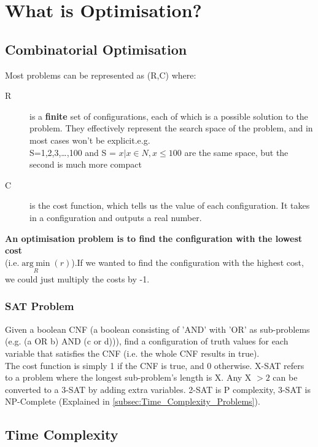 \section{What is Optimisation?}

\subsection{Combinatorial Optimisation}
Most problems can be represented as (R,C) where:
\begin{description}
    \item[R] is a \textbf{finite} set of configurations, each of which is a possible solution to the problem. They effectively represent the search space of the problem, and in most cases won't be explicit.e.g.\\
    S={1,2,3,\dots ,100} and S = ${x|x\in N, x\leq 100}$ are the same space, but the second is much more compact
    \item[C] is the cost function, which tells us the value of each configuration. It takes in a configuration and outputs a real number. 
\end{description}
\textbf{An optimisation problem is to find the configuration with the lowest cost}\\(i.e.$\underset{R}{\operatorname{arg\; min}}(r)$).If we wanted to find the configuration with the highest cost, we could just multiply the costs by -1.

\subsubsection{SAT Problem}
Given a boolean CNF (a boolean consisting of 'AND' with 'OR' as sub-problems\\(e.g. (a OR b) AND (c or d))), find a configuration of truth values for each variable that satisfies the CNF (i.e. the whole CNF results in true). \\
The cost function is simply 1 if the CNF is true, and 0 otherwise. X-SAT refers to a problem where the longest sub-problem's length is X. Any X $>2$ can be converted to a 3-SAT by adding extra variables.  2-SAT is P complexity, 3-SAT is NP-Complete (Explained in \ref{subsec:Time_Complexity_Problems}).



\subsection{Time Complexity}

